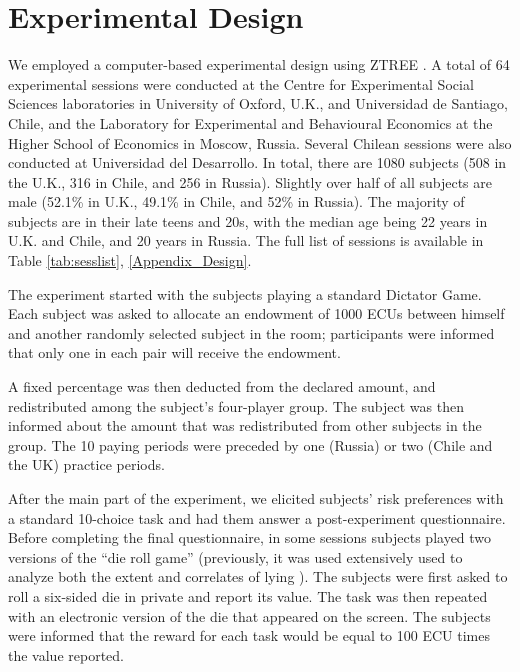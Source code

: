 \documentclass[12pt]{article}
\begin{document}
\section*{Experimental Design}

\par We employed a computer-based experimental design using ZTREE \citep{Fischbacher2007}. A total of 64 experimental sessions were conducted at the Centre for Experimental Social Sciences laboratories in University of Oxford, U.K., and Universidad de Santiago, Chile, and the Laboratory for Experimental and Behavioural Economics at the Higher School of Economics in Moscow, Russia. Several  Chilean sessions were also conducted at Universidad del Desarrollo. In total, there are 1080 subjects (508 in the U.K., 316 in Chile, and 256 in Russia). Slightly over half of all subjects are male (52.1\% in U.K., 49.1\% in Chile, and 52\% in Russia). The majority of subjects are in their late teens and 20s, with the median age being 22 years in U.K. and Chile, and 20 years in Russia. The full list of sessions is available in Table \ref{tab:sesslist}, \ref{Appendix_Design}.

\par The experiment started with the subjects playing a standard Dictator Game. Each subject was asked to allocate an endowment of 1000 ECUs between himself and another randomly selected subject in the room; participants were informed that only one in each pair will receive the endowment. 

A fixed percentage was then deducted from the declared amount, and redistributed among the subject’s four-player group. The subject was then informed about the amount that was redistributed from other subjects in the group.\footnotemark{}
The 10 paying periods were preceded by one (Russia) or two (Chile and the UK) practice periods.

\par After the main part of the experiment, we elicited subjects' risk preferences with a standard 10-choice task \citep{Holtetal2002} and had them answer a post-experiment questionnaire. Before completing the final questionnaire, in some sessions subjects played two versions of the ``die roll game'' (previously, it was used extensively used to analyze both the extent and correlates of lying \citep{Fischbacheretal2013,Abeleretal2014,Gachter2016}). The subjects were first asked to roll a six-sided die in private and report its value. The task was then repeated with an electronic version of the die that appeared on the screen. The subjects were informed that the reward for each task would be equal to 100 ECU times the value reported.
\end{document}
